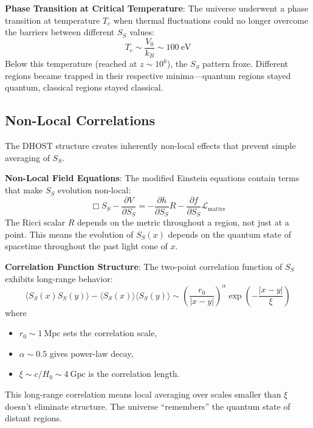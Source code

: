 \documentclass[12pt]{article}
\begin{document}
\textbf{Phase Transition at Critical Temperature}: The universe underwent a phase transition at temperature $T_c$ when thermal fluctuations could no longer overcome the barriers between different $S_S$ values:
\begin{equation}
    T_c \sim \frac{V_0}{k_B} \sim 100~\textrm{eV}
\end{equation}
Below this temperature (reached at $z \sim 10^6$), the $S_S$ pattern froze. Different regions became trapped in their respective minima—quantum regions stayed quantum, classical regions stayed classical.

\subsection{Non-Local Correlations}

The DHOST structure creates inherently non-local effects that prevent simple averaging of $S_S$.

\textbf{Non-Local Field Equations}: The modified Einstein equations contain terms that make $S_S$ evolution non-local:
\begin{equation}
    \Box S_S - \frac{\partial V}{\partial S_S} = -\frac{\partial h}{\partial S_S}R - \frac{\partial f}{\partial S_S}\mathcal{L}_\mathrm{matter}
\end{equation}
The Ricci scalar $R$ depends on the metric throughout a region, not just at a point. This means the evolution of $S_S(x)$ depends on the quantum state of spacetime throughout the past light cone of $x$.

\textbf{Correlation Function Structure}: The two-point correlation function of $S_S$ exhibits long-range behavior:
\begin{equation}
    \langle S_S(x)S_S(y)\rangle - \langle S_S(x)\rangle\langle S_S(y)\rangle \sim \left(\frac{r_0}{|x-y|}\right)^\alpha \exp\left(-\frac{|x-y|}{\xi}\right)
\end{equation}
where
\begin{itemize}
    \item $r_0 \sim 1~\textrm{Mpc}$ sets the correlation scale,
    \item $\alpha \sim 0.5$ gives power-law decay,
    \item $\xi \sim c/H_0 \sim 4~\textrm{Gpc}$ is the correlation length.
\end{itemize}
This long-range correlation means local averaging over scales smaller than $\xi$ doesn't eliminate structure. The universe ``remembers'' the quantum state of distant regions.
\end{document}
